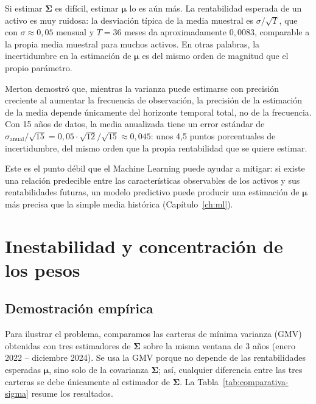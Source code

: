 Si estimar $\boldsymbol{\Sigma}$ es difícil, estimar $\boldsymbol{\mu}$
lo es aún más. La rentabilidad esperada de un activo es muy
ruidosa: la desviación típica de la media muestral es
$\sigma / \sqrt{T}$, que con $\sigma \approx 0{,}05$ mensual y
$T = 36$ meses da aproximadamente $0{,}0083$, comparable a la propia
media muestral para muchos activos. En otras palabras, la incertidumbre
en la estimación de $\boldsymbol{\mu}$ es del mismo orden de magnitud
que el propio parámetro.

Merton \cite{Merton1980} demostró que, mientras la varianza puede
estimarse con precisión creciente al aumentar la frecuencia de
observación, la precisión de la estimación de la media depende
únicamente del horizonte temporal total, no de la frecuencia. Con 15
años de datos, la media anualizada tiene un error estándar de
$\sigma_{\text{anual}}/\sqrt{15} = 0{,}05\cdot\sqrt{12}/\sqrt{15}
\approx 0{,}045$: unos 4,5 puntos porcentuales de incertidumbre, del
mismo orden que la propia rentabilidad que se quiere estimar.

Este es el punto débil que el Machine Learning puede
ayudar a mitigar: si existe una relación predecible entre las
características observables de los activos y sus rentabilidades
futuras, un modelo predictivo puede producir una estimación de
$\boldsymbol{\mu}$ más precisa que la simple media histórica
(Capítulo~\ref{ch:ml}).

\section{Inestabilidad y concentración de los pesos}

\subsection{Demostración empírica}

Para ilustrar el problema, comparamos las carteras de mínima varianza
(GMV) obtenidas con tres estimadores de $\boldsymbol{\Sigma}$ sobre la
misma ventana de 3 años (enero 2022 -- diciembre 2024). Se usa la GMV porque no
depende de las rentabilidades esperadas $\boldsymbol{\mu}$, sino solo de la
covarianza $\boldsymbol{\Sigma}$; así, cualquier diferencia entre las tres
carteras se debe únicamente al estimador de $\boldsymbol{\Sigma}$. La
Tabla~\ref{tab:comparativa-sigma} resume los resultados.

